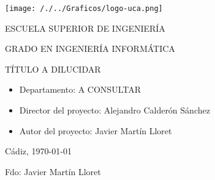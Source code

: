 


\begin{center}

  \texttt{[image: /./../Graficos/logo-uca.png]} \\

  \vspace{2.5cm}

  \Large{ESCUELA SUPERIOR DE INGENIERÍA} \\

  \vspace{1.0cm}

  \large{GRADO EN INGENIERÍA INFORMÁTICA} \\

  \vspace{2.0cm}

  \large{TÍTULO A DILUCIDAR} \\

  \vspace{2.5cm}

\end{center}

\begin{itemize}
\item \large{Departamento: A CONSULTAR}
\item \large{Director del proyecto: Alejandro Calderón Sánchez}
\item \large{Autor del proyecto: Javier Martín Lloret}
\end{itemize}

\vspace{0.2cm}

\begin{flushright}
  \large{Cádiz, \today} \\

  \vspace{2.0cm}

  \large{Fdo: Javier Martín Lloret}
\end{flushright}